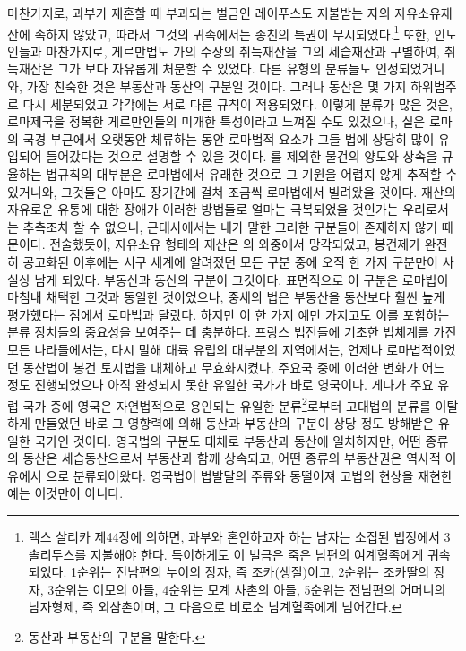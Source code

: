 마찬가지로,
과부가 재혼할 때 부과되는 벌금인
레이푸스도
지불받는 자의 자유소유재산에 속하지 않았고,
따라서 그것의 귀속에서는 종친의 특권이 무시되었다.\footnote{%
  렉스 살리카 제44장에 의하면, 과부와 혼인하고자 하는 남자는
  소집된 법정에서 3솔리두스를 지불해야 한다. 특이하게도
  이 벌금은 죽은 남편의 여계혈족에게 귀속되었다.
  1순위는 전남편의 누이의 장자, 즉 조카(생질)이고,
  2순위는 조카딸의 장자,
  3순위는 이모의 아들,
  4순위는 모계 사촌의 아들,
  5순위는 전남편의 어머니의 남자형제, 즉 외삼촌이며,
  그 다음으로 비로소 남계혈족에게 넘어간다. }
또한, 인도인들과 마찬가지로,
게르만법도
가의 수장의 취득재산을 그의 세습재산과 구별하여,
취득재산은 그가 보다 자유롭게 처분할 수 있었다.
다른 유형의 분류들도 인정되었거니와,
가장 친숙한 것은 부동산과 동산의 구분일 것이다.
그러나 동산은 몇 가지 하위범주로 다시 세분되었고
각각에는 서로 다른 규칙이 적용되었다.
이렇게 분류가 많은 것은,
로마제국을 정복한 게르만인들의 미개한 특성이라고 느껴질 수도 있겠으나,
실은
로마의 국경 부근에서 오랫동안 체류하는 동안
로마법적 요소가 그들 법에 상당히 많이 유입되어 들어갔다는 것으로
설명할 수 있을 것이다.
를 제외한 물건의 양도와 상속을 규율하는 법규칙의 대부분은
로마법에서 유래한 것으로 그 기원을 어렵지 않게 추적할 수 있거니와,
그것들은 아마도 장기간에 걸쳐
조금씩 로마법에서 빌려왔을 것이다.
재산의 자유로운 유통에 대한 장애가
이러한 방법들로
얼마는 극복되었을 것인가는 우리로서는 추측조차 할 수 없으니,
근대사에서는 내가 말한 그러한 구분들이 존재하지 않기 때문이다.
전술했듯이,
자유소유 형태의 재산은 의 와중에서 망각되었고,
봉건제가 완전히 공고화된 이후에는
서구 세계에 알려졌던 모든 구분 중에 오직 한 가지 구분만이
사실상 남게 되었다.
부동산과 동산의 구분이 그것이다.
표면적으로 이 구분은 로마법이 마침내 채택한 그것과 동일한 것이었으나,
중세의 법은 부동산을 동산보다 훨씬 높게 평가했다는 점에서
로마법과 달랐다.
하지만 이 한 가지 예만 가지고도
이를 포함하는 분류 장치들의 중요성을 보여주는 데 충분하다.
프랑스 법전들에 기초한 법체계를 가진 모든 나라들에서는,
다시 말해 대륙 유럽의 대부분의 지역에서는,
언제나 로마법적이었던 동산법이 봉건 토지법을 대체하고 무효화시켰다.
주요국 중에
이러한 변화가 어느 정도 진행되었으나 아직 완성되지 못한
유일한 국가가 바로 영국이다.
게다가 주요 유럽 국가 중에 영국은
자연법적으로 용인되는 유일한
분류\footnote{%
  동산과 부동산의 구분을 말한다.
}로부터
고대법의 분류를 이탈하게 만들었던
바로 그 영향력에 의해
동산과 부동산의 구분이
상당 정도 방해받은
유일한 국가인 것이다.
영국법의 구분도 대체로 부동산과 동산에 일치하지만,
어떤 종류의 동산은 세습동산으로서 부동산과 함께 상속되고,
어떤 종류의 부동산권은 역사적 이유에서 으로 분류되어왔다.
영국법이
법발달의 주류와 동떨어져
고법의 현상을 재현한 예는 이것만이 아니다.

